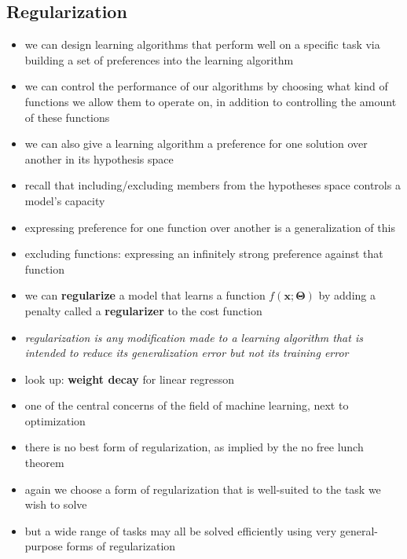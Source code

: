 \documentclass[11pt, twocolumn]{report}
\begin{document}
\subsection{Regularization}
\begin{itemize}
  \item we can design learning algorithms that perform well on a specific task
    via building a set of preferences into the learning algorithm
  \item we can control the performance of our algorithms by choosing what kind
    of functions we allow them to operate on, in addition to controlling the
    amount of these functions
  \item we can also give a learning algorithm a preference for one solution
    over another in its hypothesis space
  \item recall that including/excluding members from the hypotheses space
    controls a model's capacity
  \item expressing preference for one function over another is a generalization
    of this
  \item excluding functions: expressing an infinitely strong preference against
    that function
  \item we can \textbf{regularize} a model that learns a function
    $f(\bm{x};\bm{\Theta})$ by adding a penalty called a \textbf{regularizer}
    to the cost function
  \item \textit{regularization is any modification made to a learning algorithm
      that is intended to reduce its generalization error but not its training
      error}
  \item look up: \textbf{weight decay} for linear regresson
  \item one of the central concerns of the field of machine learning, next to
    optimization
  \item there is no best form of regularization, as implied by the no free
    lunch theorem
  \item again we choose a form of regularization that is well-suited to the
    task we wish to solve
  \item but a wide range of tasks may all be solved efficiently using very
    general-purpose forms of regularization
\end{itemize}
\end{document}
